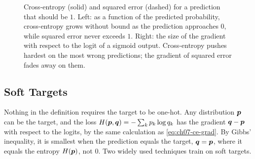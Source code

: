 \begin{figure}[ht]
  \centering
  \caption{Cross-entropy (solid) and squared error (dashed) for a
    prediction that should be $1$. Left: as a function of the predicted
    probability, cross-entropy grows without bound as the prediction
    approaches $0$, while squared error never exceeds $1$. Right: the size
    of the gradient with respect to the logit of a sigmoid output.
    Cross-entropy pushes hardest on the most wrong predictions; the
    gradient of squared error fades away on them.}
  \label{fig:ch07-ce-vs-se}
\end{figure}

\subsection{Soft Targets}
\label{sec:ch07-soft-targets}

Nothing in the definition requires the target to be one-hot. Any
distribution $\bm{p}$ can be the target, and the loss $H(\bm{p},
\bm{q}) = -\sum_k p_k \log q_k$ has the gradient $\bm{q} - \bm{p}$
with respect to the logits, by the same calculation as
\cref{eq:ch07-ce-grad}. By Gibbs' inequality, it is smallest when the
prediction equals the target, $\bm{q} = \bm{p}$, where it equals the
entropy $H(\bm{p})$, not $0$. Two widely used techniques train on soft
targets.

